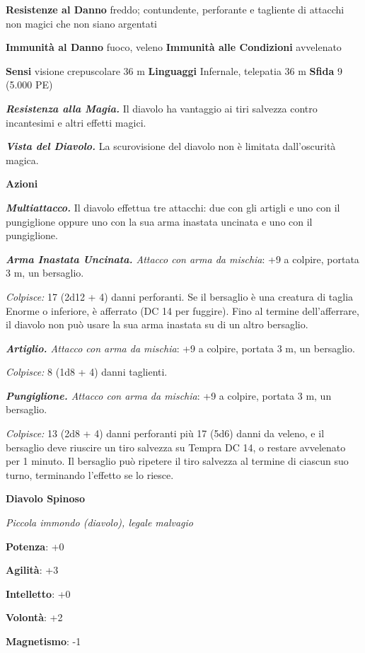 \begin{multicols}{2}
\textbf{Resistenze al Danno} freddo; contundente, perforante e tagliente
di attacchi non magici che non siano argentati

\textbf{Immunità al Danno} fuoco, veleno \textbf{Immunità alle
Condizioni} avvelenato

\textbf{Sensi} visione crepuscolare 36 m
\textbf{Linguaggi} Infernale, telepatia 36 m \textbf{Sfida} 9 (5.000 PE)

\emph{\textbf{Resistenza alla Magia.}} Il diavolo ha vantaggio ai tiri
salvezza contro incantesimi e altri effetti magici.

\emph{\textbf{Vista del Diavolo.}} La scurovisione del diavolo non è
limitata dall'oscurità magica.

\textbf{Azioni}

\emph{\textbf{Multiattacco.}} Il diavolo effettua tre attacchi: due con
gli artigli e uno con il pungiglione oppure uno con la sua arma inastata
uncinata e uno con il pungiglione.

\emph{\textbf{Arma Inastata Uncinata.} Attacco con arma da mischia}: +9
a colpire, portata 3 m, un bersaglio.

\emph{Colpisce:} 17 (2d12 + 4) danni perforanti. Se il bersaglio è una
creatura di taglia Enorme o inferiore, è afferrato (DC 14 per fuggire).
Fino al termine dell'afferrare, il diavolo non può usare la sua arma
inastata su di un altro bersaglio.

\emph{\textbf{Artiglio.} Attacco con arma da mischia}: +9 a colpire,
portata 3 m, un bersaglio.

\emph{Colpisce:} 8 (1d8 + 4) danni taglienti.

\emph{\textbf{Pungiglione.} Attacco con arma da mischia}: +9 a colpire,
portata 3 m, un bersaglio.

\emph{Colpisce:} 13 (2d8 + 4) danni perforanti più 17 (5d6) danni da
veleno, e il bersaglio deve riuscire un tiro salvezza su Tempra DC
14, o restare avvelenato per 1 minuto. Il bersaglio può ripetere il tiro
salvezza al termine di ciascun suo turno, terminando l'effetto se lo
riesce.

\textbf{Diavolo Spinoso}

\emph{Piccola immondo (diavolo), legale malvagio}

\textbf{Potenza}: +0

\textbf{Agilità}: +3

\textbf{Intelletto}: +0

\textbf{Volontà}: +2

\textbf{Magnetismo}: -1


\end{multicols}
